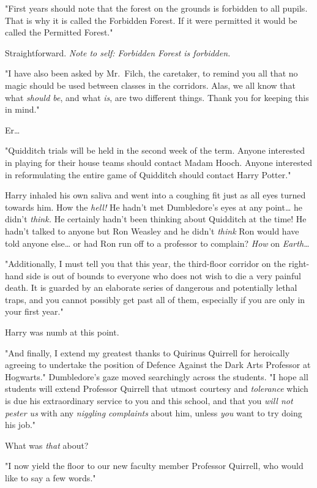 "First years should note that the forest on the grounds is forbidden to all 
pupils. That is why it is called the Forbidden Forest. If it were permitted it 
would be called the Permitted Forest."

Straightforward. \emph{Note to self: Forbidden Forest is forbidden.}

"I have also been asked by Mr.~Filch, the caretaker, to remind you all that no 
magic should be used between classes in the corridors. Alas, we all know that 
what \emph{should be}, and what \emph{is}, are two different things. Thank you 
for keeping this in mind."

Er{\ldots}

"Quidditch trials will be held in the second week of the term. Anyone 
interested in playing for their house teams should contact Madam Hooch. Anyone 
interested in reformulating the entire game of Quidditch should contact Harry 
Potter."

Harry inhaled his own saliva and went into a coughing fit just as all eyes 
turned towards him. How the \emph{hell!} He hadn't met Dumbledore's eyes at any 
point{\ldots} he didn't \emph{think.} He certainly hadn't been thinking about 
Quidditch at the time! He hadn't talked to anyone but Ron Weasley and he didn't 
\emph{think} Ron would have told anyone else{\ldots} or had Ron run off to a 
professor to complain? \emph{How} on \emph{Earth{\ldots}}

"Additionally, I must tell you that this year, the third-floor corridor on the 
right-hand side is out of bounds to everyone who does not wish to die a very 
painful death. It is guarded by an elaborate series of dangerous and 
potentially lethal traps, and you cannot possibly get past all of them, 
especially if you are only in your first year."

Harry was numb at this point.

"And finally, I extend my greatest thanks to Quirinus Quirrell for heroically 
agreeing to undertake the position of Defence Against the Dark Arts Professor 
at Hogwarts." Dumbledore's gaze moved searchingly across the students. "I hope 
all students will extend Professor Quirrell that utmost courtesy and 
\emph{tolerance} which is due his extraordinary service to you and this school, 
and that you \emph{will not pester us} with any \emph{niggling complaints} 
about him, unless \emph{you} want to try doing his job."

What was \emph{that} about?

"I now yield the floor to our new faculty member Professor Quirrell, who would 
like to say a few words."

